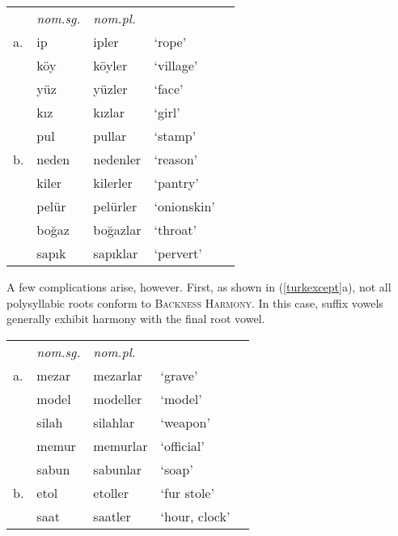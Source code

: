 \begin{example}
\label{turknom}
\begin{tabular}{lllll}
   & \emph{nom.sg.} & \emph{nom.pl.} \\
a. & {ip}           & {ipler}    & `rope'         & \citep[][216]{Clements1982} \\
   & {köy}          & {köyler}   & `village'      \\
   & {yüz}          & {yüzler}   & `face'         \\
   & {kız}          & {kızlar}   & `girl'         \\
   & {pul}          & {pullar}   & `stamp'        \\
b. & {neden}        & {nedenler} & `reason'       & \citep{TELL} \\
   & {kiler}        & {kilerler} & `pantry'       \\
   & {pelür}        & {pelürler} & `onionskin'    \\
   & {boğaz}        & {boğazlar} & `throat'       \\
   & {sapık}        & {sapıklar} & `pervert'      \\
\end{tabular}
\end{example}

A few complications arise, however. First, as shown in (\ref{turkexcept}a), not all polysyllabic roots conform to \textsc{Backness Harmony}. In this case, suffix vowels generally exhibit harmony with the final root vowel. 

\begin{example} 
\label{turkexcept}
\begin{tabular}{lllll}
   & \emph{nom.sg.} & \emph{nom.pl.}             &                    \\
a. & {mezar}        & {mezarlar} & `grave'       & \citep{TELL}       \\
   & {model}        & {modeller} & `model'                            \\
   & {silah}        & {silahlar} & `weapon'                           \\
   & {memur}        & {memurlar} & `official'                         \\
   & {sabun}        & {sabunlar} & `soap'                             \\
b. & {etol}         & {etoller}  & `fur stole'   & \citep{Goksel2005} \\
   & {saat}         & {saatler}  & `hour, clock' 	                  \\
\end{tabular}
\end{example}

